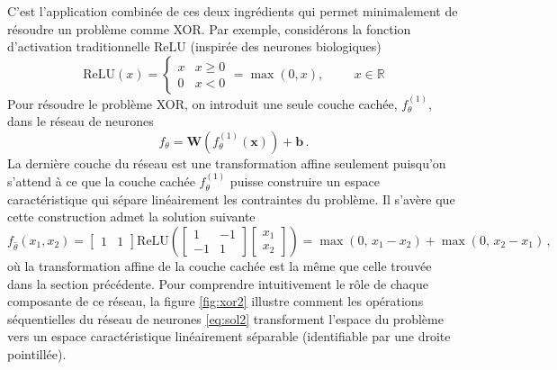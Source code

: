 C'est l'application combinée de ces deux ingrédients qui permet minimalement de résoudre un problème comme XOR. Par exemple, 
considérons la fonction d'activation traditionnelle $\mathrm{ReLU}$ (inspirée des neurones biologiques)
\begin{equation}
        \mathrm{ReLU}(x) = 
        \begin{cases}
                x & x \geq 0 \\
                0 & x < 0
        \end{cases}
        =
        \max(0, x), \hspace{1cm} x \in \mathbb{R}
\end{equation}
Pour résoudre le problème XOR, on introduit une seule couche cachée, $f_\theta^{(1)}$, dans le réseau de neurones
\begin{equation}
        f_\theta = \mathbf{W}(f^{(1)}_\theta(\mathbf{x})) + \mathbf{b}\, .
\end{equation} 
La dernière couche du réseau est une transformation affine seulement puisqu'on s'attend à ce que la couche cachée $f^{(1)}_\theta$ puisse 
construire un espace caractéristique qui sépare linéairement les contraintes du problème. Il s'avère que cette construction 
admet la solution suivante
\begin{equation}\label{eq:sol2}
        f_{\hat{\theta}}(x_1, x_2) =
        \begin{bmatrix}
                1 & 1 
        \end{bmatrix}
        \mathrm{ReLU}\left(  
        \begin{bmatrix}
        1 & -1 \\ -1 & 1     
        \end{bmatrix}
        \begin{bmatrix}
                x_1 \\ x_2
        \end{bmatrix}
        \right)
        = \max(0,\, x_1 - x_2) + \max(0,\, x_2 - x_1)\, ,
\end{equation}
où la transformation affine de la couche cachée est la même que celle trouvée dans la section précédente. Pour comprendre intuitivement 
le rôle de chaque composante de ce réseau, la figure \ref{fig:xor2} illustre comment les opérations séquentielles du réseau de neurones \eqref{eq:sol2} 
transforment l'espace du problème vers un espace caractéristique linéairement séparable (identifiable par une droite pointillée).

